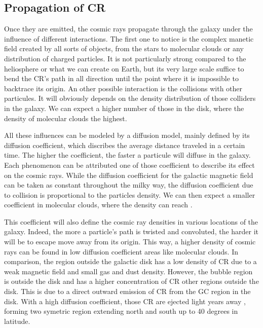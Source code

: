 \subsection{Propagation of CR}

Once they are emitted, the cosmic rays propagate through the galaxy under the influence of different interactions.
The first one to notice is the complex manetic field created by all sorts of objects, from the stars to molecular clouds or any distribution of charged particles. It is not particularly strong  compared to the heliosphere or what we can create on Earth, but its very large scale suffice to bend the CR's path in all direction until the point where it is impossible to backtrace its origin.
An other possible interaction is the collisions with other particules. It will obviously depends on the density distribution of those colliders in the galaxy. We can expect a higher number of those in the disk, where the density of molecular clouds the highest.

All these influences can be modeled by a diffusion model, mainly defined by its diffusion coefficient, which discribes the average distance traveled in a certain time. The higher the coefficient, the faster a particule will diffuse in the galaxy. Each phenomenon can be attributed one of those coefficient to describe its effect on the cosmic rays. 
While the diffusion coefficient for the galactic magnetic field can be taken as constant throughout the milky way, the diffusion coefficient due to collision is proportional to the particles density. We can then expect a smaller coefficient in molecular clouds, where the density can reach .

This coefficient will also define the cosmic ray densities in various locations of the galaxy. Indeed, the more a particle's path is twisted and convoluted, the harder it will be to escape move away from its origin. This way, a higher density of cosmic rays can be found in low diffusion coefficient areas like molecular clouds. In comparison, the region outside the galactic disk has a low density of CR due to a weak magnetic field and small gas and dust density. However, the bubble region is outside the disk and has a higher concentration of CR other regions outside the disk. This is due to a direct outward emission of CR from the GC region in the disk. With a high diffusion coefficient, those CR are ejected light years away , forming two symetric region extending north and south up to 40 degrees in latitude.


